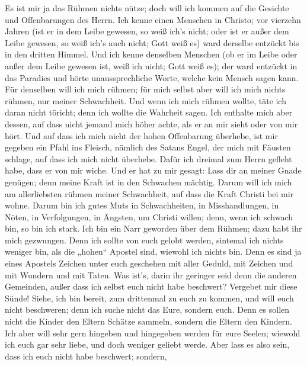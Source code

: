  Es ist mir ja das Rühmen nichts nütze; doch will ich
kommen auf die Gesichte und Offenbarungen des Herrn.  Ich
kenne einen Menschen in Christo; vor vierzehn Jahren (ist er in dem
Leibe gewesen, so weiß ich's nicht; oder ist er außer dem Leibe gewesen,
so weiß ich's auch nicht; Gott weiß es) ward derselbe entzückt bis in
den dritten Himmel.  Und ich kenne denselben Menschen (ob
er im Leibe oder außer dem Leibe gewesen ist, weiß ich nicht; Gott weiß
es);  der ward entzückt in das Paradies und hörte
unaussprechliche Worte, welche kein Mensch sagen kann. 
Für denselben will ich mich rühmen; für mich selbst aber will ich mich
nichts rühmen, nur meiner Schwachheit.  Und wenn ich mich
rühmen wollte, täte ich daran nicht töricht; denn ich wollte die
Wahrheit sagen. Ich enthalte mich aber dessen, auf dass nicht jemand
mich höher achte, als er an mir sieht oder von mir hört. 
Und auf dass ich mich nicht der hohen Offenbarung überhebe, ist mir
gegeben ein Pfahl ins Fleisch, nämlich des Satans Engel, der mich mit
Fäusten schlage, auf dass ich mich nicht überhebe.  Dafür
ich dreimal zum Herrn gefleht habe, dass er von mir wiche.
 Und er hat zu mir gesagt: Lass dir an meiner Gnade
genügen; denn meine Kraft ist in den Schwachen mächtig. Darum will ich
mich am allerliebsten rühmen meiner Schwachheit, auf dass die Kraft
Christi bei mir wohne.  Darum bin ich gutes Muts in
Schwachheiten, in Misshandlungen, in Nöten, in Verfolgungen, in Ängsten,
um Christi willen; denn, wenn ich schwach bin, so bin ich stark.
 Ich bin ein Narr geworden über dem Rühmen; dazu habt ihr
mich gezwungen. Denn ich sollte von euch gelobt werden, sintemal ich
nichts weniger bin, als die „hohen`` Apostel sind, wiewohl ich nichts
bin.  Denn es sind ja eines Apostels Zeichen unter euch
geschehen mit aller Geduld, mit Zeichen und mit Wundern und mit Taten.
 Was ist's, darin ihr geringer seid denn die anderen
Gemeinden, außer dass ich selbst euch nicht habe beschwert? Vergebet mir
diese Sünde!  Siehe, ich bin bereit, zum drittenmal zu
euch zu kommen, und will euch nicht beschweren; denn ich suche nicht das
Eure, sondern euch. Denn es sollen nicht die Kinder den Eltern Schätze
sammeln, sondern die Eltern den Kindern.  Ich aber will
sehr gern hingeben und hingegeben werden für eure Seelen; wiewohl ich
euch gar sehr liebe, und doch weniger geliebt werde. 
Aber lass es also sein, dass ich euch nicht habe beschwert; sondern,
